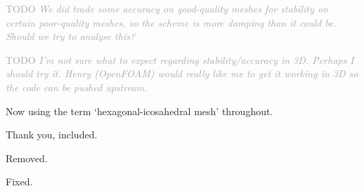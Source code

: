\documentclass[times]{elsarticle}
\newcommand{\TODO}[1]{\textcolor{darkgray}{TODO \textit{#1}}}
\begin{document}
\begin{quotation}
\begin{comment}
\item  Appendix A, p.22: How restrictive is the 1D stability analysis
    for the multidimensional domains? May this become a more
    serious issue in 3D configurations?
\end{comment}
\end{quotation}
\TODO{We did trade some accuracy on good-quality meshes for stability on certain poor-quality meshes, so the scheme is more damping than it could be.  Should we try to analyse this?}

\TODO{I'm not sure what to expect regarding stability/accuracy in 3D.  Perhaps I should try it.  Henry (OpenFOAM) would really like me to get it working in 3D so the code can be pushed upstream.}

\begin{quotation}
\begin{comment}
\item  In various places throughout the paper "icosahedra" is used
    instead of "icosadedral". I suggest the latter should be used
    consistently throughout the paper.
\end{comment}
\end{quotation}
Now using the term `hexagonal-icosahedral mesh' throughout.

\begin{quotation}
\begin{comment}
\item  p.3, end of first paragraph: I suggest to mention here a
    recent advancement of the finite-volume MPDATA (Kühnlein and
    Smolarkiewicz, J. Comput. Phys. 2017,
    \url{http://dx.doi.org/10.1016/j.jcp.2016.12.054}). Among others, this
    paper demonstrates applicability of MPDATA for 3D compressible
    atmospheric dynamics on arbitrary hybrid unstructured meshes.
\end{comment}
\end{quotation}
Thank you, included.

\begin{quotation}
\begin{comment}
\item  p.3, paragraph after Eq. (2b): if there is no specific need, I
    sugggest to remove "zero-dimensional".
\end{comment}
\end{quotation}
Removed.

\begin{quotation}
\begin{comment}
\item  p.4, last paragraph in Section 2.0: "methods are described next"
    instead of "methods described next".
\end{comment}
\end{quotation}
Fixed.
\end{document}
